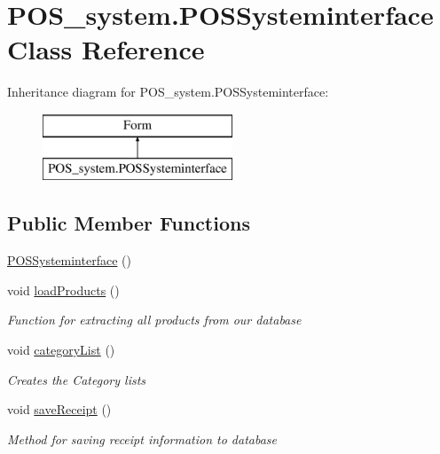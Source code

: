 \hypertarget{class_p_o_s__system_1_1_p_o_s_systeminterface}{}\section{P\+O\+S\+\_\+system.\+P\+O\+S\+Systeminterface Class Reference}
\label{class_p_o_s__system_1_1_p_o_s_systeminterface}
Inheritance diagram for P\+O\+S\+\_\+system.\+P\+O\+S\+Systeminterface\+:\begin{figure}[H]
\begin{center}
\leavevmode
\includegraphics[height=2.000000cm]{class_p_o_s__system_1_1_p_o_s_systeminterface}
\end{center}
\end{figure}
\subsection*{Public Member Functions}
\begin{DoxyCompactItemize}
\item 
\mbox{\hyperlink{class_p_o_s__system_1_1_p_o_s_systeminterface_acccddaa8ea3cd9367ba18faa2a01c963}{P\+O\+S\+Systeminterface}} ()
\item 
void \mbox{\hyperlink{class_p_o_s__system_1_1_p_o_s_systeminterface_ad88d52f27c5388b16220ca666b164ef7}{load\+Products}} ()
\begin{DoxyCompactList}\small\item\em Function for extracting all products from our database \end{DoxyCompactList}\item 
void \mbox{\hyperlink{class_p_o_s__system_1_1_p_o_s_systeminterface_a90f43829ce49854a5381d277e9a7f033}{category\+List}} ()
\begin{DoxyCompactList}\small\item\em Creates the Category lists \end{DoxyCompactList}\item 
void \mbox{\hyperlink{class_p_o_s__system_1_1_p_o_s_systeminterface_a75da901a01d10aa7273ecf4b64cd3617}{save\+Receipt}} ()
\begin{DoxyCompactList}\small\item\em Method for saving receipt information to database \end{DoxyCompactList}\end{DoxyCompactItemize}
